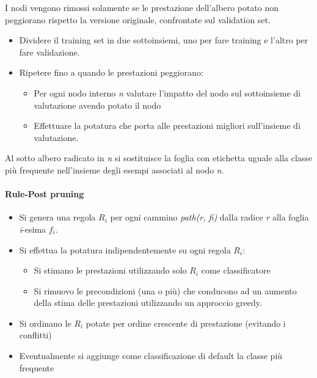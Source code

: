 I nodi vengono rimossi solamente se le prestazione dell'albero potato
non peggiorano rispetto la versione originale, confrontate sul
validation set.

\begin{itemize}
\item
  Dividere il training set in due sottoinsiemi, uno per fare training e
  l'altro per fare validazione.
\item
  Ripetere fino a quando le prestazioni peggiorano:
  \begin{itemize}
  \item
    Per ogni nodo interno \emph{n} valutare l'impatto del nodo sul
    sottoinsieme di valutazione avendo potato il nodo
  \item
    Effettuare la potatura che porta alle prestazioni migliori
    sull'insieme di valutazione.
  \end{itemize}
\end{itemize}

Al sotto albero radicato in \emph{n} si sostituisce la foglia con
etichetta uguale alla classe più frequente nell'insieme degli esempi
associati al nodo \emph{n}.

\paragraph{Rule-Post pruning}\label{rule-post-pruning}

\begin{itemize}
\item
  Si genera una regola $R_i$ per ogni cammino \emph{path(r, fi)}
  dalla radice \emph{r} alla foglia \emph{i}-esima $f_i$.
\item
  Si effettua la potatura indipendentemente su ogni regola $R_i$:

  \begin{itemize}
  \item
    Si stimano le prestazioni utilizzando solo $R_i$ come
    classificatore
  \item
    Si rimuovo le precondizioni (una o più) che conducono ad un aumento
    della stima delle prestazioni utilizzando un approccio greedy.
  \end{itemize}
\item
  Si ordinano le $R_i$ potate per ordine crescente di prestazione
  (evitando i conflitti)
\item
  Eventualmente si aggiunge come classificazione di default la classe più
  frequente
\end{itemize}

